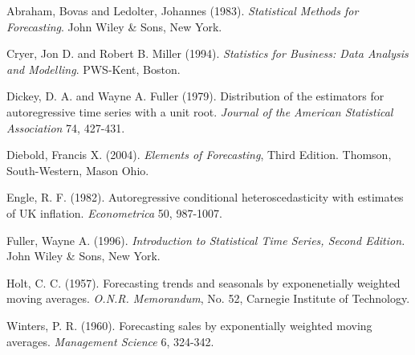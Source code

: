 \begin{multicols}{2}


Abraham, Bovas and Ledolter, Johannes (1983). \textit{Statistical
Methods for Forecasting}. John Wiley \& Sons, New York.

Cryer, Jon D. and Robert B. Miller (1994). \textit{Statistics for
Business: Data Analysis and Modelling}. PWS-Kent, Boston.

Dickey, D. A. and Wayne A. Fuller (1979). Distribution of the
estimators for autoregressive time series with a unit root.
\textit{Journal of the American Statistical Association} 74,
427-431.

Diebold, Francis X. (2004). \textit{Elements of Forecasting}, Third Edition.
Thomson, South-Western, Mason Ohio.

Engle, R. F. (1982). Autoregressive conditional heteroscedasticity
with estimates of UK inflation. \textit{Econometrica} 50, 987-1007.

Fuller, Wayne A. (1996). \textit{Introduction to Statistical Time
Series, Second Edition.} John Wiley \& Sons, New York.

Holt, C. C. (1957). Forecasting trends and seasonals by
exponenetially weighted moving averages. \textit{O.N.R. Memorandum},
No. 52, Carnegie Institute of Technology.

Winters, P. R. (1960). Forecasting sales by exponentially weighted
moving averages. \textit{Management Science} 6, 324-342.


\end{multicols}
